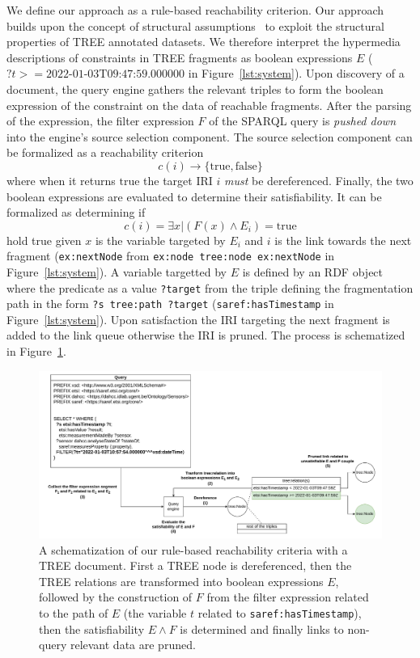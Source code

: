 We define our approach as a rule-based reachability criterion.
Our approach builds upon the concept of structural assumptions~\cite{taelman2023} to exploit the structural properties of TREE annotated datasets.
We therefore interpret the hypermedia descriptions of constraints in TREE fragments as boolean expressions $E$ ($?t>= \text{2022-01-03T09:47:59.000000}$ in Figure~\ref{lst:system}).
Upon discovery of a document, the query engine gathers the relevant triples to form the boolean expression of the constraint on the data of reachable fragments.
After the parsing of the expression, the filter expression $F$ of the SPARQL query is \textit{pushed down} into the engine's source selection component.
The source selection component can be formalized as a reachability criterion~ 
\begin{equation}
c(i) \rightarrow \{\mathrm{true}, \mathrm{false}\}
\end{equation}
where when it returns $\mathrm{true}$ the target IRI $i$ \emph{must} be dereferenced.
Finally, the two boolean expressions are evaluated to determine their satisfiability.
It can be formalized as determining if 
\begin{equation}
    c(i) = \exists x | (F(x) \land E_i) = \mathrm{true}
\end{equation}
hold true given $x$ is the variable targeted by $E_i$ and $i$ is the link towards the next fragment (\texttt{ex:nextNode} from \texttt{ex:node tree:node ex:nextNode} in Figure~\ref{lst:system}).
A variable targetted by $E$ is defined by an RDF object where the predicate as a value \texttt{?target} from the triple
defining the fragmentation path in the form \texttt{?s tree:path ?target} (\texttt{saref:hasTimestamp} in Figure~\ref{lst:system}).
Upon satisfaction the IRI targeting the next fragment is added to the link queue otherwise the IRI is pruned.
The process is schematized in Figure~\ref{fig:process}.

\begin{figure}[htbp]
    \centering
    \includegraphics[width=\linewidth]{image/running_example.drawio.pdf}
    \caption{A schematization of our rule-based reachability criteria with a TREE document.
      First a TREE node is dereferenced, then the TREE relations are transformed into boolean expressions $E$,
      followed by the construction of $F$ from the filter expression related to the path of $E$ (the variable $t$ related to \texttt{saref:hasTimestamp}),
       then the satisfiability $E \land F$ is determined and finally links to non-query relevant data are pruned.}
    \label{fig:process}
  \end{figure}


